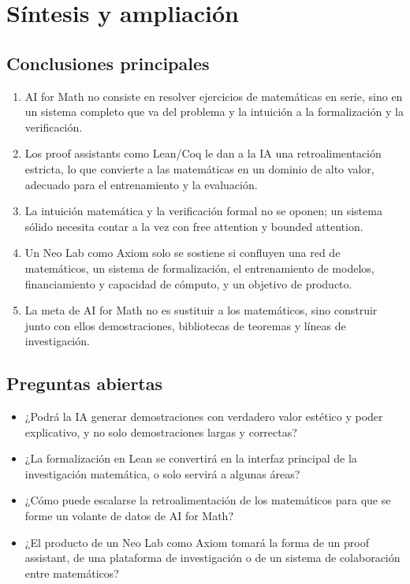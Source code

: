 \documentclass[a4paper]{article}
\begin{document}
\section{Síntesis y ampliación}

\subsection{Conclusiones principales}

\begin{enumerate}
\item AI for Math no consiste en resolver ejercicios de matemáticas en serie, sino en un sistema completo que va del problema y la intuición a la formalización y la verificación.
\item Los proof assistants como Lean/Coq le dan a la IA una retroalimentación estricta, lo que convierte a las matemáticas en un dominio de alto valor, adecuado para el entrenamiento y la evaluación.
\item La intuición matemática y la verificación formal no se oponen; un sistema sólido necesita contar a la vez con free attention y bounded attention.
\item Un Neo Lab como Axiom solo se sostiene si confluyen una red de matemáticos, un sistema de formalización, el entrenamiento de modelos, financiamiento y capacidad de cómputo, y un objetivo de producto.
\item La meta de AI for Math no es sustituir a los matemáticos, sino construir junto con ellos demostraciones, bibliotecas de teoremas y líneas de investigación.
\end{enumerate}

\subsection{Preguntas abiertas}

\begin{itemize}
\item ¿Podrá la IA generar demostraciones con verdadero valor estético y poder explicativo, y no solo demostraciones largas y correctas?
\item ¿La formalización en Lean se convertirá en la interfaz principal de la investigación matemática, o solo servirá a algunas áreas?
\item ¿Cómo puede escalarse la retroalimentación de los matemáticos para que se forme un volante de datos de AI for Math?
\item ¿El producto de un Neo Lab como Axiom tomará la forma de un proof assistant, de una plataforma de investigación o de un sistema de colaboración entre matemáticos?
\end{itemize}
\end{document}
